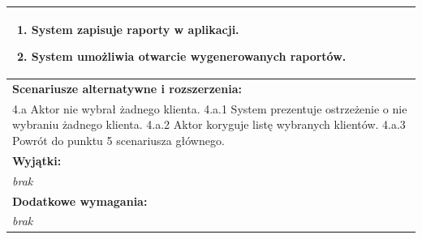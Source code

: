 \begin{center}
\begin{longtable}[h]{|p{1.6cm}|p{13.5cm}|}
{\begin{enumerate}
\item System zapisuje raporty w aplikacji.
\item System umożliwia otwarcie wygenerowanych raportów.
\end{enumerate}
} \\ \hline
\multicolumn{2}{|p{15.1cm}|}{\textbf{Scenariusze alternatywne i rozszerzenia:}} \\
\multicolumn{2}{|p{15.1cm}|}{
4.a Aktor nie wybrał żadnego klienta. \newline
4.a.1 System prezentuje ostrzeżenie o nie wybraniu żadnego klienta. \newline
4.a.2 Aktor koryguje listę wybranych klientów. \newline
4.a.3 Powrót do punktu 5 scenariusza głównego.
} \\ \hline
\multicolumn{2}{|p{15.1cm}|}{\textbf{Wyjątki:}} \\
\multicolumn{2}{|p{15.1cm}|}{
\textit{brak}
} \\ \hline
\multicolumn{2}{|p{15.1cm}|}{\textbf{Dodatkowe wymagania:}} \\
\multicolumn{2}{|p{15.1cm}|}{
\textit{brak}
} \\
\hline
\end{longtable}
\end{center}

